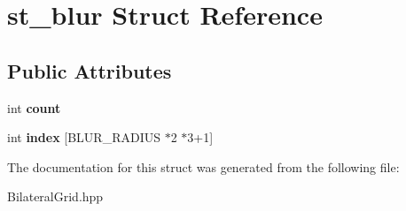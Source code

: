 \hypertarget{structst__blur}{}\section{st\+\_\+blur Struct Reference}
\label{structst__blur}
\subsection*{Public Attributes}
\begin{DoxyCompactItemize}
\item 
int {\bfseries count}\hypertarget{structst__blur_a6ca8c367119609cbdcd60b4dc8aa4bcd}{}\label{structst__blur_a6ca8c367119609cbdcd60b4dc8aa4bcd}

\item 
int {\bfseries index} \mbox{[}B\+L\+U\+R\+\_\+\+R\+A\+D\+I\+US $\ast$2 $\ast$3+1\mbox{]}\hypertarget{structst__blur_a6a718d99fb14a150b148b9ca1af6cf6b}{}\label{structst__blur_a6a718d99fb14a150b148b9ca1af6cf6b}

\end{DoxyCompactItemize}


The documentation for this struct was generated from the following file\+:\begin{DoxyCompactItemize}
\item 
Bilateral\+Grid.\+hpp\end{DoxyCompactItemize}
